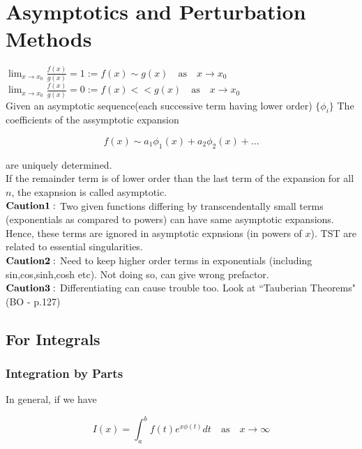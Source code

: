 \documentclass{report}
\begin{document}
\chapter{Asymptotics and Perturbation Methods}

$\lim_{x\to x_0} \frac{f(x)}{g(x)} = 1 := f(x) \sim g(x) \quad\mathrm{as}\quad  x\to x_0$\\

\noindent$\lim_{x\to x_0} \frac{f(x)}{g(x)} = 0 := f(x) << g(x)\quad\mathrm{as}\quad  x\to x_0$\\


\noindent Given an asymptotic sequence(each successive term having lower order) $\{\phi_i\}$ The coefficients of the assymptotic expansion 

$$ f(x) \sim a_1\phi_1(x) + a_2\phi_2(x) + ... $$

\noindent are uniquely determined.\\

\noindent If the remainder term is of lower order than the last term of the expansion for all $n$, the exapnsion is called asymptotic.\\

\noindent $\bold{Caution 1:}$ Two given functions differing by transcendentally small terms (exponentials as compared to powers) can have same asymptotic expansions. Hence, these terms are ignored in asymptotic expnsions (in powers of $x$). TST are related to essential singularities.\\

\noindent $\bold {Caution 2:}$ Need to keep higher order terms in exponentials (including sin,cos,sinh,cosh etc). Not doing so, can give wrong prefactor.\\

\noindent $\bold{Caution 3:}$ Differentiating can cause trouble too. Look at ``Tauberian Theorems" (BO - p.127)

\section{For Integrals}

\subsection{Integration by Parts}

\noindent In general, if we have

$$I(x) = \int_{a}^{b} f(t) e^{x\phi(t)} dt \quad\mathrm{as}\quad x\to\infty$$ 
\end{document}
